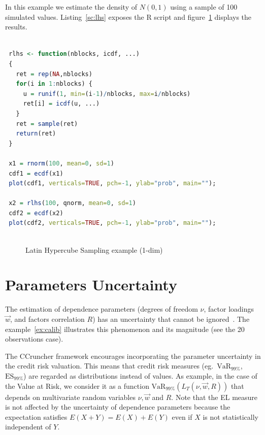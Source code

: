 \documentclass[11pt,fleqn]{book} %
\begin{document}
\begin{example}
	In this example we estimate the density of $N(0,1)$ using a sample of 
	100 simulated values. Listing~\ref{sc:lhs} exposes the R script and 
	figure~\ref{fig:lhs} displays the results.

	\begin{lstlisting}[language=R, label=sc:lhs, caption=Latin Hypercube Sampling example (R script)]

 rlhs <- function(nblocks, icdf, ...) 
 {
   ret = rep(NA,nblocks)
   for(i in 1:nblocks) {
     u = runif(1, min=(i-1)/nblocks, max=i/nblocks)
     ret[i] = icdf(u, ...)
   }
   ret = sample(ret)
   return(ret)
 }

 x1 = rnorm(100, mean=0, sd=1)
 cdf1 = ecdf(x1)
 plot(cdf1, verticals=TRUE, pch=-1, ylab="prob", main="");
 
 x2 = rlhs(100, qnorm, mean=0, sd=1)
 cdf2 = ecdf(x2)
 plot(cdf2, verticals=TRUE, pch=-1, ylab="prob", main="");
 
	\end{lstlisting}
	\begin{figure}[!ht]
		\centering
		\caption{Latin Hypercube Sampling example (1-dim)}
		\label{fig:lhs} 
	\end{figure}
\end{example}

\section{Parameters Uncertainty}

The estimation of dependence parameters (degrees of freedom $\nu$, factor
loadings $\vec{w}$, and factors correlation $R$) has an uncertainty that 
cannot be ignored~\cite{tarashev:2010,gossl:2005}. The example~\ref{ex:calib} 
illustrates this phenomenon and its magnitude (see the 20 observations case).

The CCruncher framework encourages incorporating the parameter uncertainty 
in the credit risk valuation. This means that credit risk measures
(eg.\ $\text{VaR}_{99\%}$, $\text{ES}_{99\%}$) are regarded as distributions 
instead of values. As example, in the case of the Value at Risk, we 
consider it as a function $\text{VaR}_{99\%}(L_T(\nu,\vec{w},R))$ that 
depends on multivariate random variables $\nu, \vec{w}$ and $R$.
Note that the EL measure is not affected by the uncertainty of dependence 
parameters because the expectation satisfies $E(X+Y)=E(X)+E(Y)$ even if $X$ 
is not statistically independent of $Y$.
\end{document}
